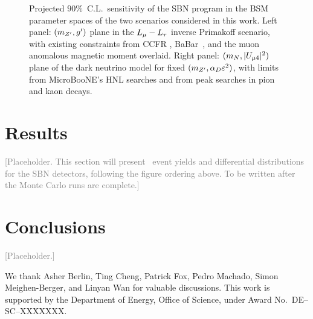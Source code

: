 \begin{figure}[t]
  \centering
  \caption{Projected $90\%$~C.L.\ sensitivity of the SBN program in
    the BSM parameter spaces of the two scenarios considered in this
    work.  Left panel: $(m_{Z^{\prime}}, g')$ plane in the $L_\mu - L_\tau$ inverse
    Primakoff scenario, with existing constraints from CCFR
    \cite{Mishra:1991bv}, BaBar~\cite{BaBar:2016sci}, and the muon
    anomalous magnetic moment overlaid.  Right panel:
    $(m_N, |U_{\mu 4}|^2)$ plane of the dark neutrino model for fixed
    $(m_{Z^{\prime}}, \alpha_D \varepsilon^2)$, with limits from MicroBooNE's
    HNL searches and from peak searches in pion and kaon decays.}
  \label{fig:sens}
\end{figure}

\section{Results}\label{sec:results}

\textcolor{gray}{[Placeholder.  This section will present \Neptune\
event yields and differential distributions for the SBN detectors,
following the figure ordering above.  To be written after the Monte
Carlo runs are complete.]}

\section{Conclusions}\label{sec:conclusions}

\textcolor{gray}{[Placeholder.]}

\begin{acknowledgments}
We thank Asher Berlin, Ting Cheng, Patrick Fox, Pedro Machado,
Simon Meighen-Berger, and Linyan Wan for valuable discussions.
This work is supported by the Department of Energy, Office of Science,
under Award No.~DE--SC--XXXXXXX.
\end{acknowledgments}

